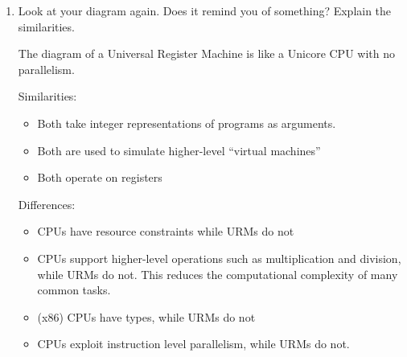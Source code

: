 \documentclass[10pt,\jkfside,a4paper]{article}
\begin{document}
\begin{enumerate}[label=(\alph*)]
\item Look at your diagram again. Does it remind you of something? Explain
the similarities.

The diagram of a Universal Register Machine is like a Unicore CPU with no
parallelism.

Similarities:
\begin{itemize}

\item Both take integer representations of programs as arguments.

\item Both are used to simulate higher-level ``virtual machines''

\item Both operate on registers

\end{itemize}

Differences:
\begin{itemize}

\item CPUs have resource constraints while URMs do not

\item CPUs support higher-level operations such as multiplication and
division, while URMs do not. This reduces the computational complexity of
many common tasks.

\item (x86) CPUs have types, while URMs do not

\item CPUs exploit instruction level parallelism, while URMs do not.

\end{itemize}

\end{enumerate}
\end{document}
